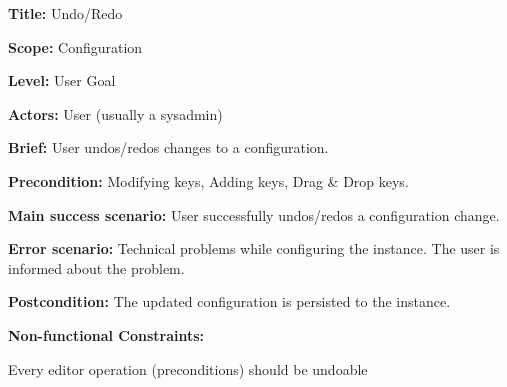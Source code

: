 
\begin{DoxyItemize}
\item {\bfseries{Title\+:}} Undo/\+Redo
\item {\bfseries{Scope\+:}} Configuration
\item {\bfseries{Level\+:}} User Goal
\item {\bfseries{Actors\+:}} User (usually a sysadmin)
\item {\bfseries{Brief\+:}} User undos/redos changes to a configuration.
\end{DoxyItemize}


\begin{DoxyItemize}
\item {\bfseries{Precondition\+:}} Modifying keys, Adding keys, Drag \& Drop keys.
\item {\bfseries{Main success scenario\+:}} User successfully undos/redos a configuration change.
\item {\bfseries{Error scenario\+:}} Technical problems while configuring the instance. The user is informed about the problem.
\item {\bfseries{Postcondition\+:}} The updated configuration is persisted to the instance.
\item {\bfseries{Non-\/functional Constraints\+:}}
\begin{DoxyItemize}
\item Every editor operation (preconditions) should be undoable 
\end{DoxyItemize}
\end{DoxyItemize}